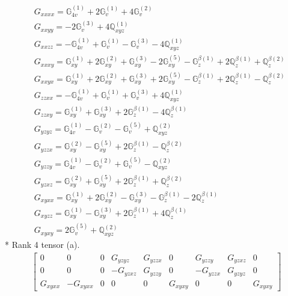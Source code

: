 \documentclass[fleqn,8pt,landscape]{jsarticle}
\begin{document}
\begin{align*}
& G_{xxxx} = \mathbb{G}_{4v}^{(1)} + 2 \mathbb{G}_{v}^{(1)} + 4 \mathbb{G}_{v}^{(2)} \\
& G_{xxyy} = - 2 \mathbb{G}_{v}^{(3)} + 4 \mathbb{Q}_{xyz}^{(1)} \\
& G_{xxzz} = - \mathbb{G}_{4v}^{(1)} + \mathbb{G}_{v}^{(1)} - \mathbb{G}_{v}^{(3)} - 4 \mathbb{Q}_{xyz}^{(1)} \\
& G_{xxxy} = \mathbb{G}_{xy}^{(1)} + 2 \mathbb{G}_{xy}^{(2)} + \mathbb{G}_{xy}^{(3)} - 2 \mathbb{G}_{xy}^{(5)} - \mathbb{G}_{z}^{\beta(1)} + 2 \mathbb{Q}_{z}^{\beta(1)} + \mathbb{Q}_{z}^{\beta(2)} \\
& G_{xxyx} = \mathbb{G}_{xy}^{(1)} + 2 \mathbb{G}_{xy}^{(2)} + \mathbb{G}_{xy}^{(3)} + 2 \mathbb{G}_{xy}^{(5)} - \mathbb{G}_{z}^{\beta(1)} + 2 \mathbb{Q}_{z}^{\beta(1)} - \mathbb{Q}_{z}^{\beta(2)} \\
& G_{zzxx} = - \mathbb{G}_{4v}^{(1)} + \mathbb{G}_{v}^{(1)} + \mathbb{G}_{v}^{(3)} + 4 \mathbb{Q}_{xyz}^{(1)} \\
& G_{zzxy} = \mathbb{G}_{xy}^{(1)} + \mathbb{G}_{xy}^{(3)} + 2 \mathbb{G}_{z}^{\beta(1)} - 4 \mathbb{Q}_{z}^{\beta(1)} \\
& G_{yzyz} = \mathbb{G}_{4v}^{(1)} - \mathbb{G}_{v}^{(2)} - \mathbb{G}_{v}^{(5)} + \mathbb{Q}_{xyz}^{(2)} \\
& G_{yzzx} = \mathbb{G}_{xy}^{(2)} - \mathbb{G}_{xy}^{(5)} + 2 \mathbb{G}_{z}^{\beta(1)} - \mathbb{Q}_{z}^{\beta(2)} \\
& G_{yzzy} = \mathbb{G}_{4v}^{(1)} - \mathbb{G}_{v}^{(2)} + \mathbb{G}_{v}^{(5)} - \mathbb{Q}_{xyz}^{(2)} \\
& G_{yzxz} = \mathbb{G}_{xy}^{(2)} + \mathbb{G}_{xy}^{(5)} + 2 \mathbb{G}_{z}^{\beta(1)} + \mathbb{Q}_{z}^{\beta(2)} \\
& G_{xyxx} = \mathbb{G}_{xy}^{(1)} + 2 \mathbb{G}_{xy}^{(2)} - \mathbb{G}_{xy}^{(3)} - \mathbb{G}_{z}^{\beta(1)} - 2 \mathbb{Q}_{z}^{\beta(1)} \\
& G_{xyzz} = \mathbb{G}_{xy}^{(1)} - \mathbb{G}_{xy}^{(3)} + 2 \mathbb{G}_{z}^{\beta(1)} + 4 \mathbb{Q}_{z}^{\beta(1)} \\
& G_{xyxy} = 2 \mathbb{G}_{v}^{(5)} + \mathbb{Q}_{xyz}^{(2)}
\end{align*}
* Rank 4 tensor (a).
\begin{align*}
\begin{bmatrix} 0 & 0 & 0 & G_{yzyz} & G_{yzzx} & 0 & G_{yzzy} & G_{yzxz} & 0 \\ 0 & 0 & 0 & - G_{yzxz} & G_{yzzy} & 0 & - G_{yzzx} & G_{yzyz} & 0 \\ G_{xyxx} & - G_{xyxx} & 0 & 0 & 0 & G_{xyxy} & 0 & 0 & G_{xyxy} \end{bmatrix}
\end{align*}
\end{document}
